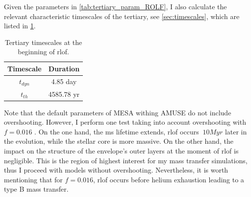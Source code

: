 Given the parameters in \cref{tab:tertiary_param_ROLF}, I also calculate the relevant characteristic timescales of the tertiary, see \cref{sec:timescales}, which are listed in \cref{tab:tertiary_timescale_ROLF}.
\begin{table}[H]
    \centering
    \begin{tabular}{| c | c |}
       Timescale & Duration \\
       \hline
       $t_{dyn}$ & 4.85 day\\
       $t_{th}$ & 4585.78 yr 
    \end{tabular}
    \caption{ Tertiary timescales at the beginning of \ac{rlof}.}
    \label{tab:tertiary_timescale_ROLF}
\end{table}

Note that the default parameters of MESA withing AMUSE do not include overshooting. However, I perform one test taking into account overshooting with $f=0.016$ \citep{herwig2000evolution}. On the one hand, the \ac{ms} lifetime extends, \ac{rlof} occurs $~10Myr$ later in the evolution, while the stellar core is more massive. On the other hand, the impact on the structure of the envelope's outer layers at the moment of \ac{rlof} is negligible. This is the region of highest interest for my mass transfer simulations, thus I proceed with models without overshooting. Nevertheless, it is worth mentioning that for $f=0.016$, \ac{rlof} occurs before helium exhaustion leading to a type B mass transfer.
